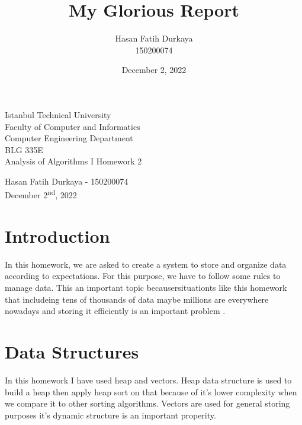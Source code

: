 \documentclass[a4paper, 12pt, titlepage]{article}
\title{My Glorious Report}
\author{Hasan Fatih Durkaya \\ 150200074}
\date{December 2, 2022}
\begin{document}


\begin{titlepage}
	\begin{center}
		\large{Istanbul Technical University \\ Faculty of Computer and Informatics \\ Computer Engineering Department} \\
		\vspace{150pt}
		\Large{BLG 335E \\ Analysis of Algorithms I Homework 2 }  \\
		\vspace{30pt}

		\large{Hasan Fatih Durkaya - 150200074} \\
		\vspace{\fill} %
		\large{December 2\textsuperscript{nd}, 2022}
	\end{center}
\end{titlepage}
\newpage
\tableofcontents
\newpage

\section{Introduction}
In this homework, we are asked to create a system to store and organize data according to expectations. For this purpose, we have to follow some rules to manage data. This an important topic becausersituationts like this homework that includeing tens of thousands of data maybe millions are everywhere nowadays and storing it efficiently is an important problem .

\section{Data Structures}
    In this homework I have used heap and vectors. Heap data structure is used to build a heap then apply heap sort on that because of it's lower complexity when we compare it to other sorting algorithms. Vectors are used for general storing purposes it's dynamic structure is an important properity.
\end{document}
